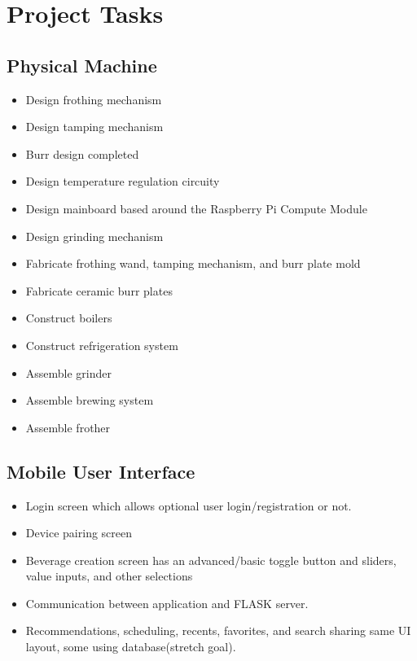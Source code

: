 \documentclass[conference]{IEEEtran}
\begin{document}
\section{Project Tasks}

\subsection{Physical Machine}

\begin{itemize}
\item Design frothing mechanism
\item Design tamping mechanism
\item Burr design completed
\item Design temperature regulation circuity
\item Design mainboard based around the Raspberry Pi Compute Module
\item Design grinding mechanism
\item Fabricate frothing wand, tamping mechanism, and burr plate mold
\item Fabricate ceramic burr plates
\item Construct boilers
\item Construct refrigeration system
\item Assemble grinder
\item Assemble brewing system
\item Assemble frother
\end{itemize}

\subsection{Mobile User Interface}
\begin{itemize}
  \item Login screen which allows optional user login/registration or not.
  \item Device pairing screen
  \item Beverage creation screen has an advanced/basic toggle button and sliders, value inputs, and other selections
  \item Communication between application and FLASK server.
  \item Recommendations, scheduling, recents, favorites, and search sharing same UI layout, some using database(stretch goal).
\end{itemize}

\end{document}
